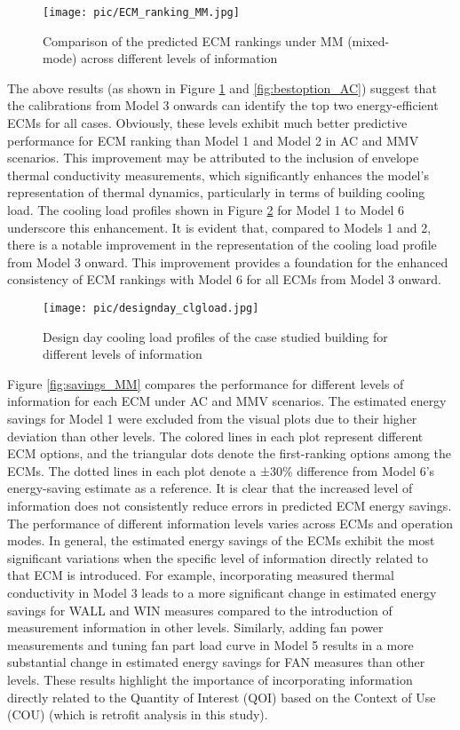 \documentclass[3p,times,12pt]{elsarticle}
\begin{document}
\begin{sloppypar}
\begin{figure}[H]
\centering\texttt{[image: pic/ECM\_ranking\_MM.jpg]}
\caption{Comparison of the predicted ECM rankings under MM (mixed-mode) across different levels of information}
\label{fig:bestoption_MM}
\end{figure}

The above results (as shown in Figure \ref{fig:bestoption_MM} and \ref{fig:bestoption_AC}) suggest that the calibrations from Model 3 onwards can identify the top two energy-efficient ECMs for all cases. Obviously, these levels exhibit much better predictive performance for ECM ranking than Model 1 and Model 2 in AC and MMV scenarios. This improvement may be attributed to the inclusion of envelope thermal conductivity measurements, which significantly enhances the model's representation of thermal dynamics, particularly in terms of building cooling load. The cooling load profiles shown in Figure \ref{fig:cooling_loads} for Model 1 to Model 6 underscore this enhancement. It is evident that, compared to Models 1 and 2, there is a notable improvement in the representation of the cooling load profile from Model 3 onward. This improvement provides a foundation for the enhanced consistency of ECM rankings with Model 6 for all ECMs from Model 3 onward. 

\begin{figure}[H]
\centering\texttt{[image: pic/designday\_clgload.jpg]}
\caption{Design day cooling load profiles of the case studied building for different levels of information}
\label{fig:cooling_loads}
\end{figure}

Figure \ref{fig:savings_MM} compares the performance for different levels of information for each ECM under AC and MMV scenarios. The estimated energy savings for Model 1 were excluded from the visual plots due to their higher deviation than other levels. The colored lines in each plot represent different ECM options, and the triangular dots denote the first-ranking options among the ECMs. The dotted lines in each plot denote a ±30\% difference from Model 6's energy-saving estimate as a reference. It is clear that the increased level of information does not consistently reduce errors in predicted ECM energy savings. The performance of different information levels varies across ECMs and operation modes. In general, the estimated energy savings of the ECMs exhibit the most significant variations when the specific level of information directly related to that ECM is introduced. For example, incorporating measured thermal conductivity in Model 3 leads to a more significant change in estimated energy savings for WALL and WIN measures compared to the introduction of measurement information in other levels. Similarly, adding fan power measurements and tuning fan part load curve in Model 5 results in a more substantial change in estimated energy savings for FAN measures than other levels. These results highlight the importance of incorporating information directly related to the Quantity of Interest (QOI) based on the Context of Use (COU) (which is retrofit analysis in this study). 


\end{sloppypar}
\end{document}
